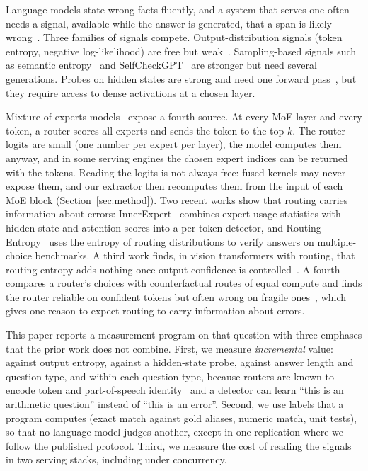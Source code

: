 \documentclass[11pt]{article}
\begin{document}
Language models state wrong facts fluently, and a system that serves one often needs a signal, available while the answer is generated, that a span is likely wrong~\citep{ji2023survey,huang2025survey}.
Three families of signals compete.
Output-distribution signals (token entropy, negative log-likelihood) are free but weak~\citep{snyder2024early}.
Sampling-based signals such as semantic entropy~\citep{kuhn2023semantic,farquhar2024detecting} and SelfCheckGPT~\citep{manakul2023selfcheckgpt} are stronger but need several generations.
Probes on hidden states are strong and need one forward pass~\citep{azaria2023internal,chwang2024androids,kossen2024semantic,orgad2025llms,obeso2025realtime}, but they require access to dense activations at a chosen layer.

Mixture-of-experts models~\citep{fedus2022switch} expose a fourth source.
At every MoE layer and every token, a router scores all experts and sends the token to the top $k$.
The router logits are small (one number per expert per layer), the model computes them anyway, and in some serving engines the chosen expert indices can be returned with the tokens.
Reading the logits is not always free: fused kernels may never expose them, and our extractor then recomputes them from the input of each MoE block (Section~\ref{sec:method}).
Two recent works show that routing carries information about errors: InnerExpert~\citep{fonseca2026innerexpert} combines expert-usage statistics with hidden-state and attention scores into a per-token detector, and Routing Entropy~\citep{li2026routing} uses the entropy of routing distributions to verify answers on multiple-choice benchmarks.
A third work finds, in vision transformers with routing, that routing entropy adds nothing once output confidence is controlled~\citep{liang2026auditing}.
A fourth compares a router's choices with counterfactual routes of equal compute and finds the router reliable on confident tokens but often wrong on fragile ones~\citep{yoon2026misrouted}, which gives one reason to expect routing to carry information about errors.

This paper reports a measurement program on that question with three emphases that the prior work does not combine.
First, we measure \emph{incremental} value: against output entropy, against a hidden-state probe, against answer length and question type, and within each question type, because routers are known to encode token and part-of-speech identity~\citep{antoine2025pos} and a detector can learn ``this is an arithmetic question'' instead of ``this is an error''.
Second, we use labels that a program computes (exact match against gold aliases, numeric match, unit tests), so that no language model judges another, except in one replication where we follow the published protocol.
Third, we measure the cost of reading the signals in two serving stacks, including under concurrency.
\end{document}
